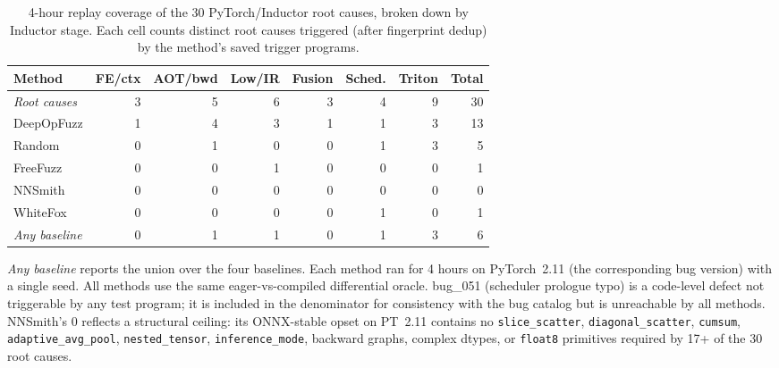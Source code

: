 \begin{table}[tbp]
\centering
\caption{4-hour replay coverage of the 30 PyTorch/Inductor root causes, broken down by Inductor stage. Each cell counts distinct root causes triggered (after fingerprint dedup) by the method's saved trigger programs.}
\label{tab:pipeline-gap}
\setlength{\tabcolsep}{3.0pt}
\renewcommand{\arraystretch}{1.06}
\begin{tabular}{@{}lrrrrrrr@{}}
\toprule
Method & FE/ctx & AOT/bwd & Low/IR & Fusion & Sched. & Triton & Total \\
\midrule
\emph{Root causes} & 3 & 5 & 6 & 3 & 4 & 9 & 30 \\
\midrule
DeepOpFuzz  & 1 & 4 & 3 & 1 & 1 & 3 & 13 \\
Random      & 0 & 1 & 0 & 0 & 1 & 3 & 5 \\
FreeFuzz    & 0 & 0 & 1 & 0 & 0 & 0 & 1 \\
NNSmith     & 0 & 0 & 0 & 0 & 0 & 0 & 0 \\
WhiteFox    & 0 & 0 & 0 & 0 & 1 & 0 & 1 \\
\midrule
\emph{Any baseline} & 0 & 1 & 1 & 0 & 1 & 3 & 6 \\
\bottomrule
\end{tabular}
\vspace{0.25em}
\begin{minipage}{0.96\columnwidth}
\footnotesize
\emph{Any baseline} reports the union over the four baselines. 
Each method ran for 4 hours on PyTorch~2.11 (the corresponding bug version) with a single seed. 
All methods use the same eager-vs-compiled differential oracle. 
bug\_051 (scheduler prologue typo) is a code-level defect not triggerable by any test program; it is included in the denominator for consistency with the bug catalog but is unreachable by all methods. 
NNSmith's $0$ reflects a structural ceiling: its ONNX-stable opset on PT~2.11 contains no \texttt{slice\_scatter}, \texttt{diagonal\_scatter}, \texttt{cumsum}, \texttt{adaptive\_avg\_pool}, \texttt{nested\_tensor}, \texttt{inference\_mode}, backward graphs, complex dtypes, or \texttt{float8} primitives required by 17+ of the 30 root causes.
\end{minipage}
\vspace{-3mm}
\end{table}
